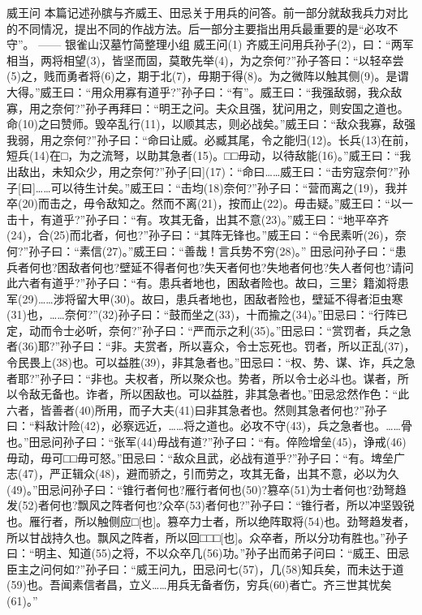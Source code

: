 \documentclass[12pt,UTF8]{ctexbook}
\begin{document}
威王问
本篇记述孙膑与齐威王、田忌关于用兵的问答。前一部分就敌我兵力对比的不同情况，提出不同的作战方法。后一部分主要指出用兵最重要的是“必攻不守”。
—— 银雀山汉墓竹简整理小组
威王问(1)
齐威王问用兵孙子(2)，曰：“两军相当，两将相望(3)，皆坚而固，莫敢先举(4)，为之奈何?”孙子答曰：“以轻卒尝(5)之，贱而勇者将(6)之，期于北(7)，毋期于得(8)。为之微阵以触其侧(9)。是谓大得。”威王曰：“用众用寡有道乎?”孙子曰：“有”。威王曰：“我强敌弱，我众敌寡，用之奈何?”孙子再拜曰：“明王之问。夫众且强，犹问用之，则安国之道也。命(10)之曰赞师。毁卒乱行(11)，以顺其志，则必战矣。”威王曰：“敌众我寡，敌强我弱，用之奈何?”孙子曰：“命曰让威。必臧其尾，令之能归(12)。长兵(13)在前，短兵(14)在□，为之流弩，以助其急者(15)。□□毋动，以待敌能(16)。”威王曰：“我出敌出，未知众少，用之奈何?”孙子[曰](17)：“命曰……威王曰：“击穷寇奈何?”孙子[曰]……可以待生计矣。”威王曰：“击均(18)奈何?”孙子曰：“营而离之(19)，我并卒(20)而击之，毋令敌知之。然而不离(21)，按而止(22)。毋击疑。”威王曰：“以一击十，有道乎?”孙子曰：“有。攻其无备，出其不意(23)。”威王曰：“地平卒齐(24)，合(25)而北者，何也?”孙子曰：“其阵无锋也。”威王曰：“令民素听(26)，奈何?”孙子曰：“素信(27)。”威王曰：“善哉！言兵势不穷(28)。”
田忌问孙子曰：“患兵者何也?困敌者何也?壁延不得者何也?失天者何也?失地者何也?失人者何也?请问此六者有道乎?”孙子曰：“有。患兵者地也，困敌者险也。故曰，三里{氵籍}洳将患军(29)……涉将留大甲(30)。故曰，患兵者地也，困敌者险也，壁延不得者{洰虫}寒(31)也，……奈何?”(32)孙子曰：“鼓而坐之(33)，十而揄之(34)。”田忌曰：“行阵已定，动而令士必听，奈何?”孙子曰：“严而示之利(35)。”田忌曰：“赏罚者，兵之急者(36)耶?”孙子曰：“非。夫赏者，所以喜众，令士忘死也。罚者，所以正乱(37)，令民畏上(38)也。可以益胜(39)，非其急者也。”田忌曰：“权、势、谋、诈，兵之急者耶?”孙子曰：“非也。夫权者，所以聚众也。势者，所以令士必斗也。谋者，所以令敌无备也。诈者，所以困敌也。可以益胜，非其急者也。”田忌忿然作色：“此六者，皆善者(40)所用，而子大夫(41)曰非其急者也。然则其急者何也?”孙子曰：“料敌计险(42)，必察远近，……将之道也。必攻不守(43)，兵之急者也。……骨也。”田忌问孙子曰：“张军(44)毋战有道?”孙子曰：“有。倅险增垒(45)，诤戒(46)毋动，毋可□□毋可怒。”田忌曰：“敌众且武，必战有道乎?”孙子曰：“有。埤垒广志(47)，严正辑众(48)，避而骄之，引而劳之，攻其无备，出其不意，必以为久(49)。”田忌问孙子曰：“锥行者何也?雁行者何也(50)?篡卒(51)为士者何也?劲弩趋发(52)者何也?飘风之阵者何也?众卒(53)者何也?”孙子曰：“锥行者，所以冲坚毁锐也。雁行者，所以触侧应□[也]。篡卒力士者，所以绝阵取将(54)也。劲弩趋发者，所以甘战持久也。飘风之阵者，所以回□□□[也]。众卒者，所以分功有胜也。”孙子曰：“明主、知道(55)之将，不以众卒几(56)功。”孙子出而弟子问曰：“威王、田忌臣主之问何如?”孙子曰：“威王问九，田忌问七(57)，几(58)知兵矣，而未达于道(59)也。吾闻素信者昌，立义……用兵无备者伤，穷兵(60)者亡。齐三世其忧矣(61)。”
\end{document}
